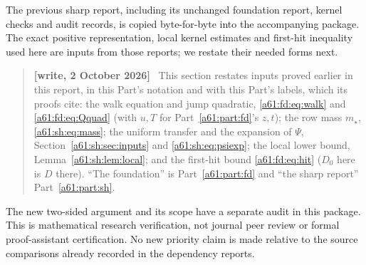 \documentclass[11pt,letterpaper]{article}
\numberwithin{equation}{section}
\theoremstyle{remark}\newtheorem{remark}[theorem]{Remark}
\newcommand{\st}{\star}
\newenvironment{writenote}{\par\smallskip\begin{quote}\small\textbf{[write, 2 October 2026]}\ }{\end{quote}\smallskip}
\begin{document}
The previous sharp report, including its unchanged foundation report, kernel checks and audit records, is copied byte-for-byte into the accompanying package. The exact positive representation, local kernel estimates and first-hit inequality used here are inputs from those reports; we restate their needed forms next.
\begin{writenote}
This section restates inputs proved earlier in this report, in this Part's notation and with this Part's labels, which its proofs cite: the walk equation and jump quadratic, \eqref{a61:fd:eq:walk} and \eqref{a61:fd:eq:Qquad} (with $u,T$ for Part~\ref{a61:part:fd}'s $z,t$); the row mass $m_\st$, \eqref{a61:sh:eq:mass}; the uniform transfer and the expansion of $\Psi$, Section~\ref{a61:sh:sec:inputs} and \eqref{a61:sh:eq:psiexp}; the local lower bound, Lemma~\ref{a61:sh:lem:local}; and the first-hit bound \eqref{a61:fd:eq:hit} ($D_0$ here is $D$ there). ``The foundation'' is Part~\ref{a61:part:fd} and ``the sharp report'' Part~\ref{a61:part:sh}.
\end{writenote}
 The new two-sided argument and its scope have a separate audit in this package. This is mathematical research verification, not journal peer review or formal proof-assistant certification. No new priority claim is made relative to the source comparisons already recorded in the dependency reports.
\end{document}
